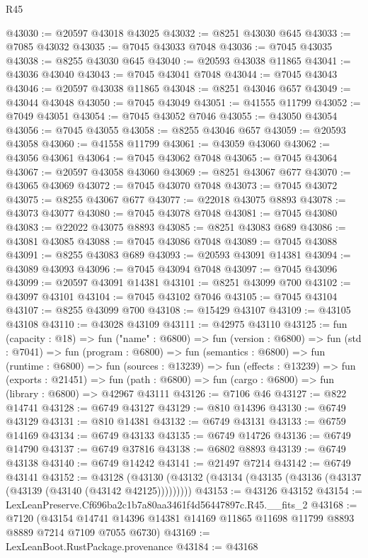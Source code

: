 \begin{lexlean}{R45}
\begin{coremodule}
{@43030 := @20597 @43018 @43025
@43032 := @8251 @43030 @645
@43033 := @7085 @43032
@43035 := @7045 @43033 @7048
@43036 := @7045 @43035
@43038 := @8255 @43030 @645
@43040 := @20593 @43038 @11865
@43041 := @43036 @43040
@43043 := @7045 @43041 @7048
@43044 := @7045 @43043
@43046 := @20597 @43038 @11865
@43048 := @8251 @43046 @657
@43049 := @43044 @43048
@43050 := @7045 @43049
@43051 := @41555 @11799
@43052 := @7049 @43051
@43054 := @7045 @43052 @7046
@43055 := @43050 @43054
@43056 := @7045 @43055
@43058 := @8255 @43046 @657
@43059 := @20593 @43058
@43060 := @41558 @11799
@43061 := @43059 @43060
@43062 := @43056 @43061
@43064 := @7045 @43062 @7048
@43065 := @7045 @43064
@43067 := @20597 @43058 @43060
@43069 := @8251 @43067 @677
@43070 := @43065 @43069
@43072 := @7045 @43070 @7048
@43073 := @7045 @43072
@43075 := @8255 @43067 @677
@43077 := @22018 @43075 @8893
@43078 := @43073 @43077
@43080 := @7045 @43078 @7048
@43081 := @7045 @43080
@43083 := @22022 @43075 @8893
@43085 := @8251 @43083 @689
@43086 := @43081 @43085
@43088 := @7045 @43086 @7048
@43089 := @7045 @43088
@43091 := @8255 @43083 @689
@43093 := @20593 @43091 @14381
@43094 := @43089 @43093
@43096 := @7045 @43094 @7048
@43097 := @7045 @43096
@43099 := @20597 @43091 @14381
@43101 := @8251 @43099 @700
@43102 := @43097 @43101
@43104 := @7045 @43102 @7046
@43105 := @7045 @43104
@43107 := @8255 @43099 @700
@43108 := @15429 @43107
@43109 := @43105 @43108
@43110 := @43028 @43109
@43111 := @42975 @43110
@43125 := fun (capacity : @18) =>
  fun ("name" : @6800) =>
  fun (version : @6800) =>
  fun (std : @7041) =>
  fun (program : @6800) =>
  fun (semantics : @6800) =>
  fun (runtime : @6800) =>
  fun (sources : @13239) =>
  fun (effects : @13239) =>
  fun (exports : @21451) =>
  fun (path : @6800) => fun (cargo : @6800) => fun (library : @6800) => @42967 @43111
@43126 := @7106 @46
@43127 := @822 @14741
@43128 := @6749 @43127
@43129 := @810 @14396
@43130 := @6749 @43129
@43131 := @810 @14381
@43132 := @6749 @43131
@43133 := @6759 @14169
@43134 := @6749 @43133
@43135 := @6749 @14726
@43136 := @6749 @14790
@43137 := @6749 @37816
@43138 := @6802 @8893
@43139 := @6749 @43138
@43140 := @6749 @14242
@43141 := @21497 @7214
@43142 := @6749 @43141
@43152 := @43128
    (@43130 (@43132 (@43134 (@43135 (@43136 (@43137 (@43139 (@43140 (@43142 @42125)))))))))
@43153 := @43126 @43152
@43154 := LexLeanPreserve.Cf696ba2c1b7a80aa3461f4d56447897c.R45.__fits_2
@43168 := @7120
    (@43154 @14741 @14396 @14381 @14169 @11865 @11698 @11799 @8893 @8889 @7214 @7109 @7055 @6730)
@43169 := LexLeanBoot.RustPackage.provenance
@43184 := @43168
}
\end{coremodule}
\end{lexlean}
